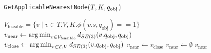 \begin{algorithm}[h!]
\caption{\texttt{GetApplicableNearestNode}($T, K, q_\text{obj}$)}\label{algo:GetFeasibleNearestNode}
\begin{algorithmic}[1]

    \State $V_{\text{feasible}} = \{v \mid v \in T.V, K.\phi(v.s, q_{\text{obj}})==1 \}$
    \State $v_{\text{near}} \gets \operatorname*{arg\,min}_{v \in V_{\text{feasible}}} d_{SE(3)}(v.q_{\text{obj}}, {q}_{\text{obj}})$
\Else {}
    \State $v_{\text{close}} \gets \operatorname*{arg\,min}_{v \in T.V} d_{SE(3)}(v.q_{\text{obj}}, {q}_{\text{obj}})$
        \State $v_\text{near} \gets v_{\text{close}}$
    \Else
        \State $v_{\text{near}} \gets \emptyset$
    \EndIf
\EndIf
\State \Return $v_{\text{near}}$

\end{algorithmic}
\end{algorithm}

